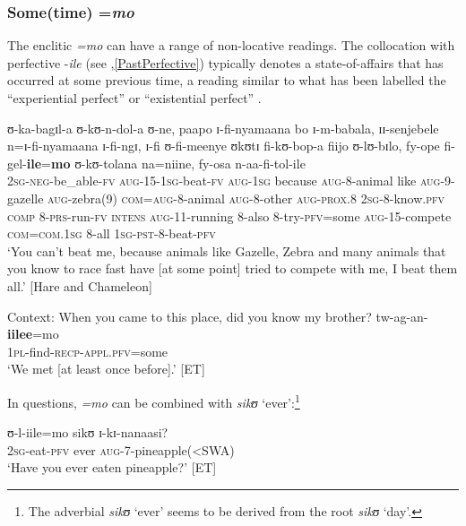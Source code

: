\subsubsection{Some(time) =\textit{mo}}\label{MoSome}
 The enclitic \textit{=mo} can have a range of non-locative readings. The collocation with perfective \mbox{-\textit{ile}} (see ,\ref{PastPerfective}) typically denotes a state-of-affairs that has occurred at some previous time, a reading similar to what has been labelled the ``experiential perfect'' \citep{ComrieB1976} or ``existential perfect'' \citep{McCawleyJ1971}.
\begin{exe}
	\ex \label{exIleMoText}
	\gll ʊ-ka-bagɪl-a ʊ-kʊ-n-dol-a ʊ-ne, paapo ɪ-fi-nyamaana bo ɪ-m-babala, ɪɪ-senjebele n=ɪ-fi-nyamaana ɪ-fi-ngɪ, ɪ-fi ʊ-fi-meenye ʊkʊtɪ fi-kʊ-bop-a fiijo ʊ-lʊ-bɪlo, fy-ope fi-gel-\textbf{ile}=\textbf{mo} ʊ-kʊ-tolana na=niine, fy-osa n-aa-fi-tol-ile\\
	\textsc{2sg}-\textsc{neg}-be\_able-\textsc{fv} \textsc{aug}-15-\textsc{1sg}-beat-\textsc{fv} \textsc{aug}-\textsc{1sg} because \textsc{aug}-8-animal like \textsc{aug}-9-gazelle \textsc{aug}-zebra(9) \textsc{com}=\textsc{aug}-8-animal \textsc{aug}-8-other \textsc{aug}-\textsc{prox.8} \textsc{2sg}-8-know.\textsc{pfv} \textsc{comp} 8-\textsc{prs}-run-\textsc{fv} \textsc{intens} \textsc{aug}-11-running 8-also 8-try-\textsc{pfv}=some \textsc{aug}-15-compete \textsc{com}=\textsc{com.1sg} 8-all \textsc{1sg}-\textsc{pst}-8-beat-\textsc{pfv}\\
	\glt `You can't beat me, because animals like Gazelle, Zebra and many animals that you know to race fast have [at some point] tried to compete with me, I beat them all.' [Hare and Chameleon]

	\ex\label{exIleMoQuestionnaire}
	Context: When you came to this place, did you know my brother?
	\gll tw-ag-an-\textbf{iile}\textbf{e}=mo\\
	\textsc{1pl}-find-\textsc{recp}-\textsc{appl.pfv}=some\\
	\glt `We met [at least once before].' [ET]
\end{exe}

In questions, \textit{=mo} can be combined with \textit{sikʊ} `ever':\footnote{The adverbial \textit{sikʊ} `ever' seems to be derived from the root \textit{sikʊ} `day'.}
\begin{exe}
	\ex \gll ʊ-l-iile=mo sikʊ ɪ-kɪ-nanaasi?\\
	\textsc{2sg}-eat-\textsc{pfv} ever \textsc{aug}-7-pineapple(<SWA)\\
	\glt `Have you ever eaten pineapple?' [ET]
\end{exe}

